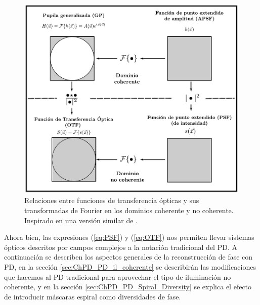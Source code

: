 \begin{figure}[h!]
\centering
\includegraphics[scale=.8]{kernels_sistemas_formadores_de_imagen.pdf}
\caption[Relaciones entre funciones de transferencia ópticas y sus FT.]{Relaciones entre funciones de transferencia ópticas y sus
  transformadas de Fourier en los dominios coherente y no
  coherente. Inspirado en una versión similar de .}
\label{fig:ChPD_kernels_sistemas_formadores_de_imagen}
\end{figure} 
Ahora bien, las expresiones (\ref{eq:PSF}) y (\ref{eq:OTF}) nos
permiten llevar sistemas ópticos descritos por campos complejos a la
notación tradicional del PD. A continuación se describen los aspectos
 generales de la reconstrucción de fase con PD, en la sección
 \ref{sec:ChPD_PD_il_coherente} se describirán las modificaciones que
 hacemos al PD tradicional para aprovechar el tipo de iluminación no
 coherente, y en la sección \ref{sec:ChPD_PD_Spiral_Diversity} se
 explica el efecto de introducir máscaras espiral como diversidades de
 fase. 

